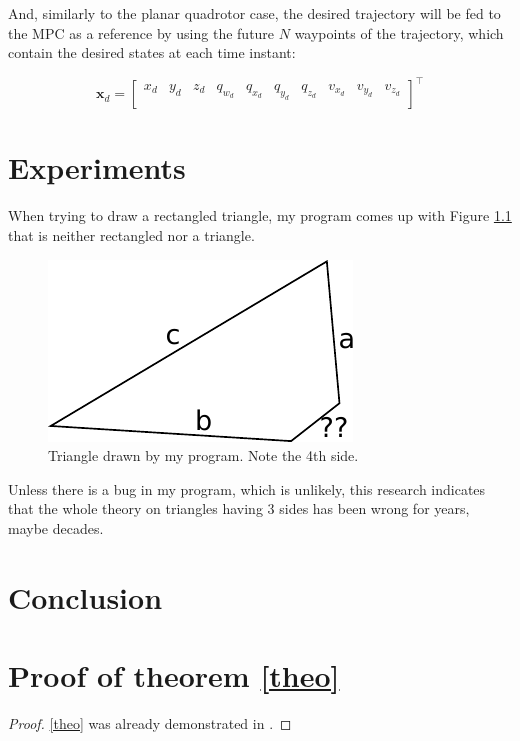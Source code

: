 \documentclass{thesisreport}
\begin{document}
And, similarly to the planar quadrotor case, the desired trajectory will be fed to the MPC as a reference by using the future $N$ waypoints of the trajectory, which contain the desired states at each time instant:

\begin{equation}
	\bm{x}_d = \begin{bmatrix}
		x_d & y_d & z_d & q_{w_d} & q_{x_d} & q_{y_d} & q_{z_d} & v_{x_d} & v_{y_d} & v_{z_d}\\
	\end{bmatrix}^{\intercal}
\end{equation}











 \chapter{Experiments}
 
 When trying to draw a rectangled triangle, my program comes up with Figure \ref{triangle2} that is neither rectangled nor a triangle.
 
  \begin{figure}[h]\centering
  \includegraphics[width=.5\linewidth]{triangle2}
  \caption{Triangle drawn by my program. Note the 4th side.} \label{triangle2}
 \end{figure}
 
Unless there is a bug in my program, which is unlikely, this research indicates that the whole theory on triangles having 3 sides has been wrong for years, maybe decades.

 
 \chapter*{Conclusion}
 
 
 
 
 
 \appendix	
 
 \chapter{Proof of theorem \ref{theo}}
 \label{sec:prooftheorem}
 
 
 \begin{proof}
\eqref{theo} was already demonstrated in \cite{euclides300}.
\end{proof}
 
 
 
 
 
 
 
\end{document}
